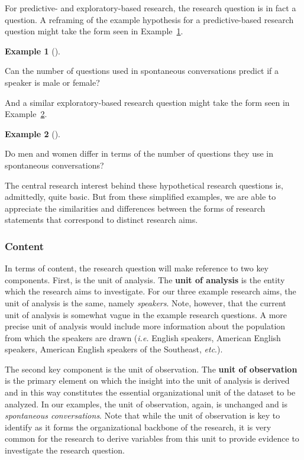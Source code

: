 \documentclass[
  letterpaper,
]{latex/krantz}
\theoremstyle{definition}
\newtheorem{example}{Example}[chapter]
\theoremstyle{remark}
\begin{document}
For predictive- and exploratory-based research, the research question is
in fact a question. A reframing of the example hypothesis for a
predictive-based research question might take the form seen in
Example~\ref{exm-fr-form-pred}.

\begin{example}[]\protect\hypertarget{exm-fr-form-pred}{}\label{exm-fr-form-pred}

Can the number of questions used in spontaneous conversations predict if
a speaker is male or female?

\end{example}

And a similar exploratory-based research question might take the form
seen in Example~\ref{exm-fr-form-exp}.

\begin{example}[]\protect\hypertarget{exm-fr-form-exp}{}\label{exm-fr-form-exp}

Do men and women differ in terms of the number of questions they use in
spontaneous conversations?

\end{example}

The central research interest behind these hypothetical research
questions is, admittedly, quite basic. But from these simplified
examples, we are able to appreciate the similarities and differences
between the forms of research statements that correspond to distinct
research aims.

\subsubsection{Content}\label{sec-fr-question-content}

In terms of content, the research question will make reference to two
key components. First, is the unit of analysis. The \textbf{unit of
analysis} is the entity which the research aims to investigate. For our
three example research aims, the unit of analysis is the same, namely
\emph{speakers}. Note, however, that the current unit of analysis is
somewhat vague in the example research questions. A more precise unit of
analysis would include more information about the population from which
the speakers are drawn (\emph{i.e.} English speakers, American English
speakers, American English speakers of the Southeast, \emph{etc}.).

The second key component is the unit of observation. The \textbf{unit of
observation} is the primary element on which the insight into the unit
of analysis is derived and in this way constitutes the essential
organizational unit of the dataset to be analyzed. In our examples, the
unit of observation, again, is unchanged and is \emph{spontaneous
conversations}. Note that while the unit of observation is key to
identify as it forms the organizational backbone of the research, it is
very common for the research to derive variables from this unit to
provide evidence to investigate the research question.
\end{document}
